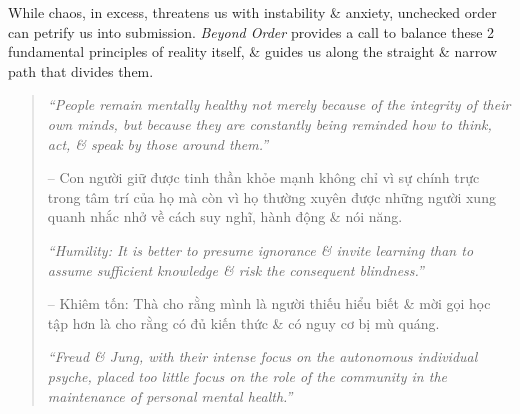 \documentclass{article}
\begin{document}
\begin{enumerate}
	While chaos, in excess, threatens us with instability \& anxiety, unchecked order can petrify us into submission. {\it Beyond Order} provides a call to balance these 2 fundamental principles of reality itself, \& guides us along the straight \& narrow path that divides them.
	\begin{quotation}
		{\it``People remain mentally healthy not merely because of the integrity of their own minds, but because they are constantly being reminded how to think, act, \& speak by those around them.''}
		
		-- Con người giữ được tinh thần khỏe mạnh không chỉ vì sự chính trực trong tâm trí của họ mà còn vì họ thường xuyên được những người xung quanh nhắc nhở về cách suy nghĩ, hành động \& nói năng.
		
		{\it``Humility: It is better to presume ignorance \& invite learning than to assume sufficient knowledge \& risk the consequent blindness.''}
		
		-- Khiêm tốn: Thà cho rằng mình là người thiếu hiểu biết \& mời gọi học tập hơn là cho rằng có đủ kiến thức \& có nguy cơ bị mù quáng.
		
		{\it``{\sc Freud} \& {\sc Jung}, with their intense focus on the autonomous individual psyche, placed too little focus on the role of the community in the maintenance of personal mental health.''}
		

\end{quotation}
\end{enumerate}
\end{document}
